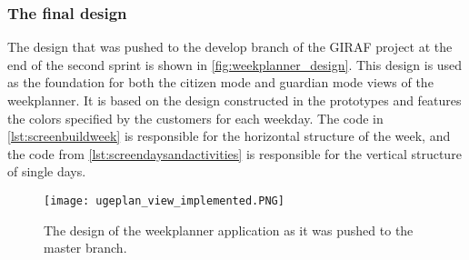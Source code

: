 \subsubsection{The final design}
The design that was pushed to the develop branch of the GIRAF project at the end of the second sprint is shown in \autoref{fig:weekplanner_design}.
This design is used as the foundation for both the citizen mode and guardian mode views of the weekplanner.
It is based on the design constructed in the prototypes and features the colors specified by the customers for each weekday.
The code in \autoref{lst:screenbuildweek} is responsible for the horizontal structure of the week, and the code from \autoref{lst:screendaysandactivities} is responsible for the vertical structure of single days.


\begin{figure}[h!]
  \centering
  \texttt{[image: ugeplan\_view\_implemented.PNG]}
  \caption{The design of the weekplanner application as it was pushed to the master branch.}
  \label{fig:weekplanner_design}
\end{figure}